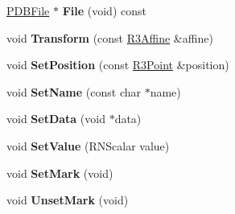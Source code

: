 \begin{DoxyCompactItemize}
\item 
\hyperlink{class_p_d_b_file}{P\+D\+B\+File} $\ast$ {\bfseries File} (void) const \hypertarget{class_p_d_b_atom_ab0ee90da074cb1d264dbb0e6d2657571}{}\label{class_p_d_b_atom_ab0ee90da074cb1d264dbb0e6d2657571}

\item 
void {\bfseries Transform} (const \hyperlink{class_r3_affine}{R3\+Affine} \&affine)\hypertarget{class_p_d_b_atom_a79ce99d31372db103bf208aa80b7e174}{}\label{class_p_d_b_atom_a79ce99d31372db103bf208aa80b7e174}

\item 
void {\bfseries Set\+Position} (const \hyperlink{class_r3_point}{R3\+Point} \&position)\hypertarget{class_p_d_b_atom_ac5f981b351907658ca5e02284cf4f8dd}{}\label{class_p_d_b_atom_ac5f981b351907658ca5e02284cf4f8dd}

\item 
void {\bfseries Set\+Name} (const char $\ast$name)\hypertarget{class_p_d_b_atom_a827035dbf6a83f29ce4fa918fc14791d}{}\label{class_p_d_b_atom_a827035dbf6a83f29ce4fa918fc14791d}

\item 
void {\bfseries Set\+Data} (void $\ast$data)\hypertarget{class_p_d_b_atom_a9fa4fa655bb1fe185455bfca549c1a8f}{}\label{class_p_d_b_atom_a9fa4fa655bb1fe185455bfca549c1a8f}

\item 
void {\bfseries Set\+Value} (R\+N\+Scalar value)\hypertarget{class_p_d_b_atom_ace0876ce319bc112021553ea1e79afa5}{}\label{class_p_d_b_atom_ace0876ce319bc112021553ea1e79afa5}

\item 
void {\bfseries Set\+Mark} (void)\hypertarget{class_p_d_b_atom_a588f22480d50aa96ba54f82e9b940556}{}\label{class_p_d_b_atom_a588f22480d50aa96ba54f82e9b940556}

\item 
void {\bfseries Unset\+Mark} (void)\hypertarget{class_p_d_b_atom_adb3aa1bba4516fa3e5409507af2cac63}{}\label{class_p_d_b_atom_adb3aa1bba4516fa3e5409507af2cac63}

\end{DoxyCompactItemize}
